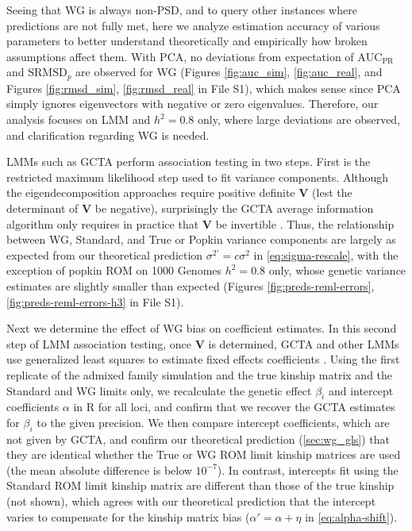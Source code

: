 \documentclass[9pt,twocolumn,twoside]{gsajnl}
\newcommand{\rmsd}{\text{SRMSD}_p}
\newcommand{\auc}{\text{AUC}_\text{PR}}
\begin{document}
Seeing that WG is always non-PSD, and to query other instances where predictions are not fully met, here we analyze estimation accuracy of various parameters to better understand theoretically and empirically how broken assumptions affect them.
With PCA, no deviations from expectation of $\auc$ and $\rmsd$ are observed for WG (Figures \ref{fig:auc_sim}, \ref{fig:auc_real}, and Figures \ref*{fig:rmsd_sim}, \ref*{fig:rmsd_real} in File S1), which makes sense since PCA simply ignores eigenvectors with negative or zero eigenvalues.
Therefore, our analysis focuses on LMM and $h^2=0.8$ only, where large deviations are observed, and clarification regarding WG is needed.

LMMs such as GCTA perform association testing in two steps.
First is the restricted maximum likelihood step used to fit variance components.
Although the eigendecomposition approaches \citep{kang_efficient_2008, lippert_fast_2011, svishcheva_rapid_2012, zhou_genome-wide_2012, sul_population_2018} require positive definite $\mathbf{V}$ (lest the determinant of $\mathbf{V}$ be negative), surprisingly the GCTA average information algorithm only requires in practice that $\mathbf{V}$ be invertible \citep{yang_gcta:_2011}.
Thus, the relationship between WG, Standard, and True or Popkin variance components are largely as expected from our theoretical prediction $\sigma^{2\prime} = c \sigma^2$ in \cref{eq:sigma-rescale}, with the exception of popkin ROM on 1000 Genomes $h^2=0.8$ only, whose genetic variance estimates are slightly smaller than expected (Figures \ref*{fig:preds-reml-errors}, \ref*{fig:preds-reml-errors-h3} in File S1).

Next we determine the effect of WG bias on coefficient estimates.
In this second step of LMM association testing, once $\mathbf{V}$ is determined, GCTA and other LMMs use generalized least squares to estimate fixed effects coefficients \citep{kang_efficient_2008, kang_variance_2010, yang_advantages_2014}.
Using the first replicate of the admixed family simulation and the true kinship matrix and the Standard and WG limits only, we recalculate the genetic effect $\beta_i$ and intercept coefficients $\alpha$ in R for all loci, and confirm that we recover the GCTA estimates for $\beta_i$ to the given precision.
We then compare intercept coefficients, which are not given by GCTA, and confirm our theoretical prediction (\cref{sec:wg_gls}) that they are identical whether the True or WG ROM limit kinship matrices are used (the mean absolute difference is below $10^{-7}$).
In contrast, intercepts fit using the Standard ROM limit kinship matrix are different than those of the true kinship (not shown), which agrees with our theoretical prediction that the intercept varies to compensate for the kinship matrix bias ($\alpha' = \alpha + \eta$ in \cref{eq:alpha-shift}).
\end{document}
